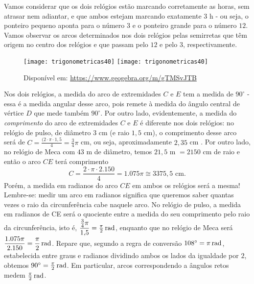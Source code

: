 Vamos considerar que os dois relógios estão marcando corretamente as horas, sem atrasar nem adiantar, e que ambos estejam marcando exatamente $3$ h - ou seja, o ponteiro pequeno aponta para o número $3$ e o ponteiro grande para o número $12$. Vamos observar os arcos determinados nos dois relógios pelas semirretas que têm origem no centro dos relógios e que passam pelo $12$ e pelo $3$, respectivamente.

\begin{figure}[H]
\centering

\texttt{[image: trigonometricas40]}
\hspace{2em}
\texttt{[image: trigonometricas40]}
\caption{Disponível em: \url{https://www.geogebra.org/m/gTMSvJTB}}
\label{}
\end{figure}

Nos dois relógios, a medida do arco de extremidades $C$ e $E$ tem a medida de $90^{\circ}$ - essa é a medida angular desse arco, pois remete à medida do ângulo central de vértice $D$ que mede também $90^{\circ}$. Por outro lado, evidentemente, a medida do \textit{comprimento} do arco de extremidades $C$ e $E$ é diferente nos dois relógios: no relógio de pulso, de diâmetro $3$ cm (e raio $1{,}5$ cm), o comprimento desse arco será de $C=\frac{(2\cdot\pi\cdot1{,}5}{4}=\frac{3}{4}\pi$ cm, ou seja, aproximadamente $2{,}35$ cm . Por outro lado, no relógio de Meca com $43$ m de diâmetro, temos $21{,}5\text{ m } = 2150$ cm de raio e então o arco $CE$ terá comprimento  
\begin{equation*}
C=\dfrac{2\cdot\pi\cdot2.150}{4}=1.075\pi\cong3375{,}5\text{ cm}.
\end{equation*}
Porém, a medida em radianos do arco $CE$ em ambos os relógios será a mesma! Lembre-se: medir um arco em radianos significa que queremos saber quantas vezes o raio da circunferência cabe naquele arco. No relógio de pulso, a medida em radianos de CE será o quociente entre a medida do seu comprimento pelo raio da circunferência, isto é, $\dfrac{\frac{3}{4}\pi}{1{,}5}=\frac{\pi}{2}\operatorname{rad}$, enquanto que no relógio de Meca será $\dfrac{1.075\pi}{2.150}=\dfrac{\pi}{2}\operatorname{rad}$. Repare que, segundo a regra de conversão $108^{\circ}=\pi\operatorname{rad}$, estabelecida entre graus e radianos dividindo ambos os lados da igualdade por $2$, obtemos $90^{\circ}=\frac{\pi}{2}\operatorname{rad}$. Em particular, arcos correspondendo a ângulos retos medem $\frac{\pi}{2}\operatorname{rad}$.

